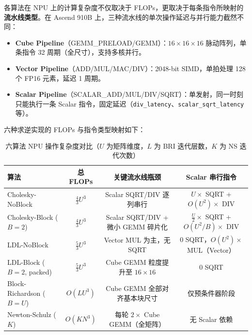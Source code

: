 \documentclass{CjC}
\begin{document}
    各算法在 NPU 上的计算复杂度不仅取决于 FLOPs，更取决于每条指令所映射的\textbf{流水线类型}。在
    Ascend 910B 上，三种流水线的单次操作延迟与并行能力截然不同：

    \begin{itemize}
        \item \textbf{Cube Pipeline}（GEMM\_PRELOAD/GEMM）：$16\times16\times16$
            脉动阵列，单条指令 32 周期（全尺寸），支持多核并行。

        \item \textbf{Vector Pipeline}（ADD/MUL/MAC/DIV）：2048-bit SIMD，单拍处理
            128 个 FP16 元素，延迟 1 周期。

        \item \textbf{Scalar Pipeline}（SCALAR\_ADD/MUL/DIV/SQRT）：单发射，同一时刻只能执行一条
            Scalar 指令，固定延迟（\texttt{div\_latency}、\texttt{scalar\_sqrt\_latency}
            等）。
    \end{itemize}

    六种求逆实现的 FLOPs 与指令类型映射如下：

    \begin{table}[H]
        \centering
        \caption{六算法 NPU 操作复杂度对比（$U$ 为矩阵维度，$L$ 为 BRI
        迭代层数，$K$ 为 NS 迭代次数）}
        \label{tab:five-op-complexity}
        \begin{tabular}{l c c c}
            \toprule \textbf{算法}      & \textbf{总 FLOPs}   & \textbf{关键流水线瓶颈}              & \textbf{Scalar 串行指令}                               \\
            \midrule Cholesky-NoBlock & $\frac{4}{3}U^{3}$ & Scalar SQRT/DIV 逐列串行          & $U \times$ SQRT + $O(U^{2}) \times$ DIV            \\
            Cholesky-Block ($B=2$)    & $\frac{4}{3}U^{3}$ & Scalar SQRT/DIV + 微小 GEMM 碎片化 & $\frac{U}{2}\times$ SQRT + $O(U^{2}/B) \times$ DIV \\
            LDL-NoBlock               & $\frac{5}{3}U^{3}$ & Vector MUL 为主，无 SQRT          & 0 SQRT，$O(U^{2}) \times$ MUL（Vector）               \\
            LDL-Block ($B=2$, packed) & $\frac{5}{3}U^{3}$ & Cube GEMM 粒度提升至 $16\times16$  & 0 SQRT                                             \\
            Block-Richardson ($B=U$)  & $O(LU^{3})$        & Cube GEMM 全部对齐基本块尺寸           & 仅预条件器阶段                                            \\
            Newton-Schulz ($K$)       & $O(KN^{3})$        & 每轮 $2\times$ Cube GEMM（全矩阵）   & 无 Scalar 依赖                                        \\
            \bottomrule
        \end{tabular}
    \end{table}
\end{document}
